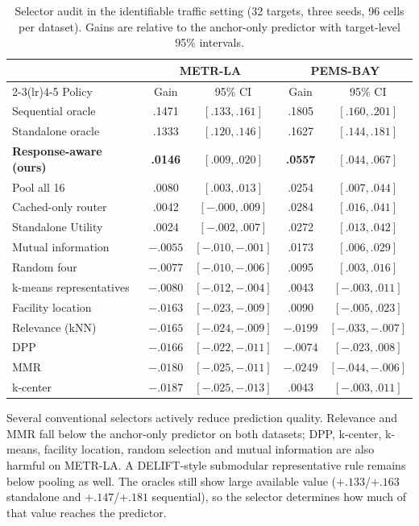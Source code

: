 \begin{table}[t]
 \centering
 \tablefont
 \caption{Selector audit in the identifiable traffic setting (32 targets,
 three seeds, 96 cells per dataset). Gains are relative to the anchor-only
 predictor with target-level 95\% intervals.}
 \label{tab:ridge-matrix}
 \begin{tabular}{lcccc}
  \toprule
  & \multicolumn{2}{c}{METR-LA} & \multicolumn{2}{c}{PEMS-BAY}\\
  \cmidrule(lr){2-3}\cmidrule(lr){4-5}
  Policy & Gain & 95\% CI & Gain & 95\% CI\\
  \midrule
  Sequential oracle & .1471 & $[.133,.161]$ & .1805 & $[.160,.201]$\\
  Standalone oracle & .1333 & $[.120,.146]$ & .1627 & $[.144,.181]$\\
  \textbf{Response-aware (ours)} & \textbf{.0146} & $[.009,.020]$ & \textbf{.0557} & $[.044,.067]$\\
  Pool all 16 & .0080 & $[.003,.013]$ & .0254 & $[.007,.044]$\\
  Cached-only router & .0042 & $[-.000,.009]$ & .0284 & $[.016,.041]$\\
  Standalone Utility & .0024 & $[-.002,.007]$ & .0272 & $[.013,.042]$\\
  Mutual information & $-.0055$ & $[-.010,-.001]$ & .0173 & $[.006,.029]$\\
  Random four & $-.0077$ & $[-.010,-.006]$ & .0095 & $[.003,.016]$\\
  k-means representatives & $-.0080$ & $[-.012,-.004]$ & .0043 & $[-.003,.011]$\\
  Facility location & $-.0163$ & $[-.023,-.009]$ & .0090 & $[-.005,.023]$\\
  Relevance (kNN) & $-.0165$ & $[-.024,-.009]$ & $-.0199$ & $[-.033,-.007]$\\
  DPP & $-.0166$ & $[-.022,-.011]$ & $-.0074$ & $[-.023,.008]$\\
  MMR & $-.0180$ & $[-.025,-.011]$ & $-.0249$ & $[-.044,-.006]$\\
  k-center & $-.0187$ & $[-.025,-.013]$ & .0043 & $[-.003,.011]$\\
  \bottomrule
 \end{tabular}
\end{table}

Several conventional selectors actively reduce prediction quality. Relevance
and MMR fall below the anchor-only predictor on both datasets; DPP, k-center,
k-means, facility location, random selection and mutual information are also
harmful on METR-LA. A DELIFT-style submodular representative rule remains below
pooling as well. The oracles still show large available value
($+.133$/$+.163$ standalone and $+.147$/$+.181$ sequential), so the selector
determines how much of that value reaches the predictor.

